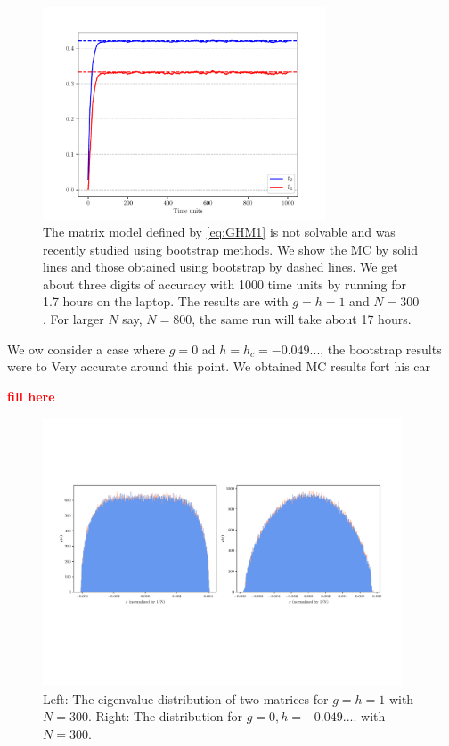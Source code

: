 \documentclass[11pt]{article}
\newcommand{\TODO}[1]{\textcolor{red}{{\bf #1}}}
\begin{document}
\begin{figure}[htbp] 
	\centering 
	\includegraphics[width=0.75\textwidth]{figs/plot_2MM_sym1.pdf}
	\caption{\label{fig:2MM_match}The matrix model defined by \ref{eq:GHM1} is not solvable and was 
	recently studied using bootstrap methods. We show the MC by solid lines and those obtained using bootstrap by dashed lines. We get about three digits of accuracy with 1000 time units by running for 1.7 hours on the laptop. The results are with $g=h=1$ and $N=300$. For larger $N$ say, $N=800$, the same run will take about 17 hours.}
\end{figure}


We ow consider a case where $g=0$ ad $h = h_{c}=-0.049...$, the bootstrap results were to 
Very accurate around this point. We obtained MC results fort his car

\TODO{fill here} 


\begin{figure}[htbp] 
	\centering 
	\includegraphics[width=0.95\textwidth]{figs/plot_2MM_evd_both.pdf}
	\caption{\label{fig:2MM_match1}Left: The eigenvalue distribution of two matrices for $g=h=1$ with $N=300$.
	Right: The distribution for $g = 0, h = -0.049....$ with $N=300$.}
\end{figure}
\end{document}
